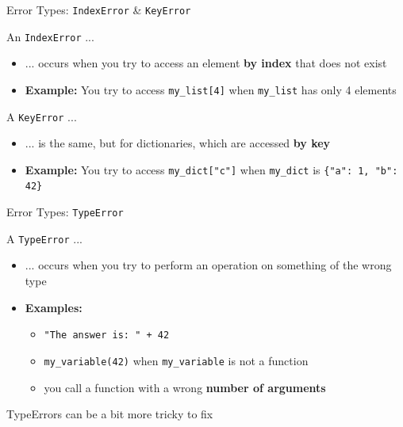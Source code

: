 \begin{frame}{Error Types: \texttt{IndexError} \& \texttt{KeyError}}

    An \texttt{IndexError} ...
    \begin{itemize}
        \item ... occurs when you try to access an element \textbf{by index} that does not exist
        \item \textbf{Example:} You try to access \texttt{my\_list[4]} when \texttt{my\_list} has only 4 elements
    \end{itemize}

    \vspace{1em}

    A \texttt{KeyError} ...
    \begin{itemize}
        \item ... is the same, but for dictionaries, which are accessed \textbf{by key}
        \item \textbf{Example:} You try to access \texttt{my\_dict["c"]} when \texttt{my\_dict} is \texttt{\{"a": 1, "b": 42\}}
    \end{itemize}


\end{frame}

\begin{frame}{Error Types: \texttt{TypeError}}

    A \texttt{TypeError} ...
    \begin{itemize}
        \item ... occurs when you try to perform an operation on something of the wrong type
        \item \textbf{Examples:}
        \begin{itemize}
            \item \texttt{"The answer is: " + 42}
            \item \texttt{my\_variable(42)} when \texttt{my\_variable} is not a function
            \item you call a function with a wrong \textbf{number of arguments}
        \end{itemize}
    \end{itemize}

    \vspace{1em}

    TypeErrors can be a bit more tricky to fix

\end{frame}


